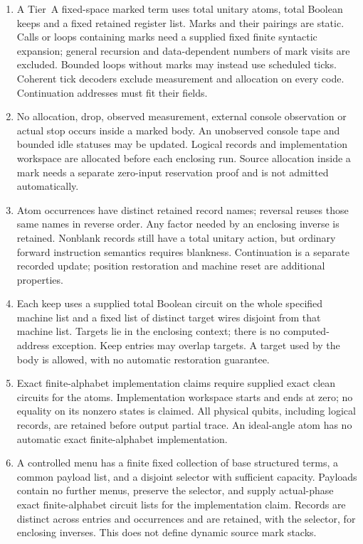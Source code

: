 \begin{enumerate}
\item A Tier~A fixed-space marked term uses total unitary atoms, total Boolean keeps and a fixed retained register list. Marks and their pairings are static. Calls or loops containing marks need a supplied fixed finite syntactic expansion; general recursion and data-dependent numbers of mark visits are excluded. Bounded loops without marks may instead use scheduled ticks. Coherent tick decoders exclude measurement and allocation on every code. Continuation addresses must fit their fields.
\item No allocation, drop, observed measurement, external console observation or actual stop occurs inside a marked body. An unobserved console tape and bounded idle statuses may be updated. Logical records and implementation workspace are allocated before each enclosing run. Source allocation inside a mark needs a separate zero-input reservation proof and is not admitted automatically.
\item Atom occurrences have distinct retained record names; reversal reuses those same names in reverse order. Any factor needed by an enclosing inverse is retained. Nonblank records still have a total unitary action, but ordinary forward instruction semantics requires blankness. Continuation is a separate recorded update; position restoration and machine reset are additional properties.
\item Each keep uses a supplied total Boolean circuit on the whole specified machine list and a fixed list of distinct target wires disjoint from that machine list. Targets lie in the enclosing context; there is no computed-address exception. Keep entries may overlap targets. A target used by the body is allowed, with no automatic restoration guarantee.
\item Exact finite-alphabet implementation claims require supplied exact clean circuits for the atoms. Implementation workspace starts and ends at zero; no equality on its nonzero states is claimed. All physical qubits, including logical records, are retained before output partial trace. An ideal-angle atom has no automatic exact finite-alphabet implementation.
\item A controlled menu has a finite fixed collection of base structured terms, a common payload list, and a disjoint selector with sufficient capacity. Payloads contain no further menus, preserve the selector, and supply actual-phase exact finite-alphabet circuit lists for the implementation claim. Records are distinct across entries and occurrences and are retained, with the selector, for enclosing inverses. This does not define dynamic source mark stacks.

\end{enumerate}
